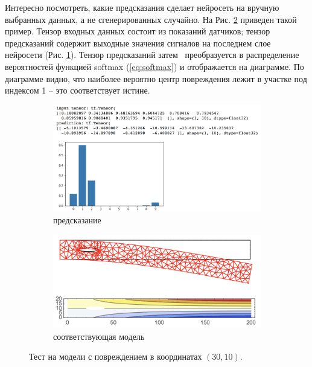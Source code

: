 \documentclass[a4paper,12pt]{article}
\theoremstyle{remark}
\begin{document}
	Интересно посмотреть, какие предсказания сделает нейросеть на вручную выбранных данных, а не сгенерированных случайно. На Рис. \ref{fig:nn1_damage_30_10} приведен такой пример. Тензор входных данных состоит из показаний датчиков; тензор предсказаний содержит выходные значения сигналов на последнем слое нейросети (Рис. \ref{fig:nn1_damage_30_10_a}). Тензор предсказаний затем  преобразуется в распределение вероятностей функцией softmax (\ref{eq:softmax}) и отображается на диаграмме. По диаграмме видно, что наиболее вероятно центр повреждения лежит в участке под индексом 1 -- это соответствует истине.
	\begin{figure}[h]
		\begin{subfigure}[t]{0.6\textwidth}
			\includegraphics[width=\linewidth]{nn1_damage_30_10.png}
			\caption{предсказание}
			\label{fig:nn1_damage_30_10_a}
		\end{subfigure}
		\begin{subfigure}[t]{0.4\textwidth}
			\includegraphics[width=\linewidth]{ds1_damage_30_10.png}
			\caption{соответствующая модель}
		\end{subfigure}
		\caption{Тест на модели с повреждением в координатах $(30, 10)$.}
		\label{fig:nn1_damage_30_10}
	\end{figure}
\end{document}

